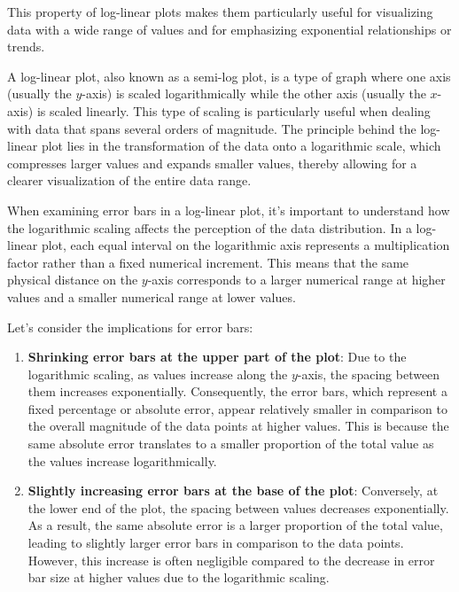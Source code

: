 \documentclass{article}
\begin{document}
This property of log-linear plots makes them particularly useful for visualizing data with a wide range of values and for emphasizing exponential relationships or trends.

A log-linear plot, also known as a semi-log plot, is a type of graph where one axis (usually the $y$-axis) is scaled logarithmically while the other axis (usually the $x$-axis) is scaled linearly. This type of scaling is particularly useful when dealing with data that spans several orders of magnitude. The principle behind the log-linear plot lies in the transformation of the data onto a logarithmic scale, which compresses larger values and expands smaller values, thereby allowing for a clearer visualization of the entire data range.

When examining error bars in a log-linear plot, it's important to understand how the logarithmic scaling affects the perception of the data distribution. In a log-linear plot, each equal interval on the logarithmic axis represents a multiplication factor rather than a fixed numerical increment. This means that the same physical distance on the $y$-axis corresponds to a larger numerical range at higher values and a smaller numerical range at lower values.

Let's consider the implications for error bars:

\begin{enumerate}
    \item \textbf{Shrinking error bars at the upper part of the plot}: Due to the logarithmic scaling, as values increase along the $y$-axis, the spacing between them increases exponentially. Consequently, the error bars, which represent a fixed percentage or absolute error, appear relatively smaller in comparison to the overall magnitude of the data points at higher values. This is because the same absolute error translates to a smaller proportion of the total value as the values increase logarithmically.
    
    \item \textbf{Slightly increasing error bars at the base of the plot}: Conversely, at the lower end of the plot, the spacing between values decreases exponentially. As a result, the same absolute error is a larger proportion of the total value, leading to slightly larger error bars in comparison to the data points. However, this increase is often negligible compared to the decrease in error bar size at higher values due to the logarithmic scaling.
\end{enumerate}
\end{document}
